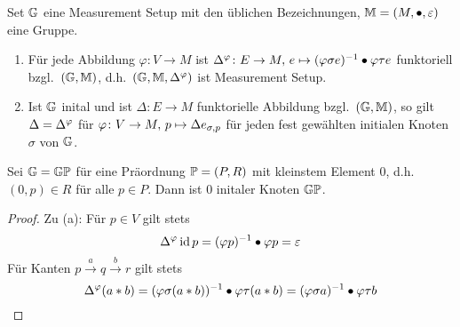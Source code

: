\begin{proposition}
    Set $\G$ eine Measurement Setup mit den üblichen Bezeichnungen, $\M = (M, \bullet, \varepsilon)$ eine Gruppe.
    \begin{enumerate}[label=(\arabic*)]
        \item Für jede Abbildung $\varphi\colon V\to M$ ist
            $\Dphi\colon E\to M,\, e\mapsto (\varphi\sigma e)^{-1}\bullet \varphi\tau e$
            funktoriell bzgl.~$(\G, \M)$, d.h.~$(\G, \M, \Dphi)$ ist Measurement Setup.
        \item Ist $\G$ inital und ist $\Delta\colon E\to M$ funktorielle Abbildung bzgl.~$(\G, \M)$,
            so gilt $\Delta = \Dphi$ für $\varphi\colon V\to M,\, p\mapsto\Delta \Init[p]$
            für jeden fest gewählten initialen Knoten $\sigma$ von $\G$.
    \end{enumerate}
    \begin{beispiel}
        Sei $\G = \G\P$ für eine Präordnung $\P = (P, R)$ mit kleinstem Element $0$,
        d.h.~ $(0, p) \in R$ für alle $p\in P$.
        Dann ist $0$ initaler Knoten $\G\P$.
    \end{beispiel}
    \begin{proof}
        Zu (a): Für $p\in V$ gilt stets
        \[
            \Dphi\id p = (\varphi p)^{-1}\bullet \varphi p = \varepsilon
        \]
        Für Kanten $p\xrightarrow{a} q\xrightarrow{b} r$ gilt stets
        \[
            \Dphi(a*b)
                = (\varphi\sigma(a*b))^{-1}\bullet \varphi\tau(a*b)
                = (\varphi\sigma a)^{-1}\bullet \varphi\tau b
        \]
    \end{proof}
\end{proposition}
